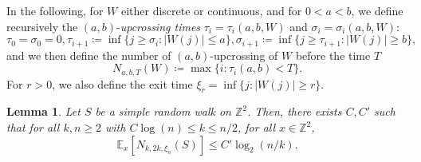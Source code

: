 \documentclass[11pt]{article}
\newtheorem{lemma}[theorem]{Lemma}
\begin{document}
In the following, for $W$ either discrete or continuous, and for $0<a<b$, we define recursively the $(a,b)$-\emph{upcrossing times} $\tau_i=\tau_i(a,b,W)$ and $\sigma_i=\sigma_i(a,b,W)$:
	\[
\tau_0=\sigma_0=0,
\tau_{i+1}\coloneqq \inf\{ j\geq \sigma_i: |W(j)|\leq a   \},
\sigma_{i+1}\coloneqq \inf\{ j\geq \tau_{i+1}: |W(j)|\geq b \},
\]
and we then define  the number of $(a,b)$-upcrossing of $W$ before the time $T$
\[N_{a,b,T}(W)\coloneqq \max\{ i : \tau_i(a,b)<T \}.\]
For $r>0$, we also define the exit time $\xi_r = \inf\{ j: |W(j)|\geq r \}$.
\begin{lemma}
    \label{le:upcross}
    Let $S$ be a simple random walk on $\mathbb{Z}^2$.	Then, there exists $C,C'$ such that for all $k,n\geq 2$ with $ C\log(n)\leq k\leq n/2$, for all $x\in \mathbb{Z}^2$,
    \[
    \mathbb{E}_x[ N_{k,2k,\xi_n}(S)   ] \leq C' \log_2( n/k).
    \]
\end{lemma}
\end{document}
